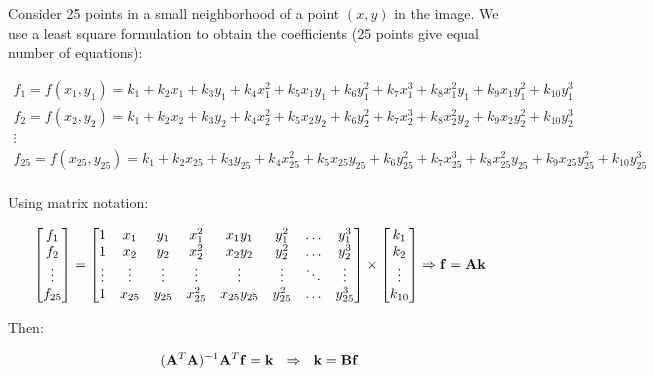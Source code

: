 \documentclass{ipol}
\numberwithin{equation}{section}
\numberwithin{table}{section}
\numberwithin{figure}{section}
\begin{document}
Consider 25 points in a small neighborhood of a point $(x,y)$ in the image. We use a least square
formulation to obtain the coefficients (25 points give equal number of equations):

\begin{equation*}
	\begin{array}{l}
		f_1 = f(x_1,y_1) = k_1 + k_2x_1 + k_3y_1 + k_4x_1^2 + k_5x_1y_1 + k_6y_1^2 + k_7x_1^3 + k_8x_1^2y_1 + k_9x_1y_1^2 + k_{10}y_1^3\\
		f_2 = f(x_2,y_2) = k_1 + k_2x_2 + k_3y_2 + k_4x_2^2 + k_5x_2y_2 + k_6y_2^2 + k_7x_2^3 + k_8x_2^2y_2 + k_9x_2y_2^2 + k_{10}y_2^3\\
		\vdots \\
		f_{25} = f(x_{25},y_{25}) = k_1 + k_2x_{25} + k_3y_{25} + k_4x_{25}^2 + k_5x_{25}y_{25} + k_6y_{25}^2 + k_7x_{25}^3 + k_8x_{25}^2y_{25} + k_9x_{25}y_{25}^2 + k_{10}y_{25}^3\\
	\end{array}
\end{equation*}

Using matrix notation:

\begin{equation*}
	\begin{bmatrix} 
		f_1		\\ 
		f_2		\\ 
		\vdots	\\
		f_{25}
	\end{bmatrix} 
	= 
	\begin{bmatrix} 
		1 		& x_1 		& y_1 		& x_1^2 	& x_1y_1 		& y_1^2 	& \hdots 	& y_1^3 	\\
		1 		& x_2 		& y_2 		& x_2^2 	& x_2y_2 		& y_2^2 	& \hdots 	& y_2^3 	\\
		\vdots	& \vdots	& \vdots	& \vdots	& \vdots		& \vdots	& \ddots	& \vdots	\\
		1 		& x_{25}	& y_{25}	& x_{25}^2 	& x_{25}y_{25} 	& y_{25}^2 	& \hdots 	& y_{25}^3
	\end{bmatrix}
	\times
	\begin{bmatrix}
		k_1		\\
		k_2		\\
		\vdots	\\
		k_{10}
	\end{bmatrix}
	\Rightarrow \mathbf{f} = \mathbf{A}\mathbf{k}\\
\end{equation*}

Then:

\begin{equation*}
	(\mathbf{A}^T\mathbf{A})^{-1}\mathbf{A}^T\mathbf{f} = \mathbf{k} \ \ \Rightarrow \ \ \mathbf{k} = \mathbf{B}\mathbf{f}\\
\end{equation*}
\end{document}
